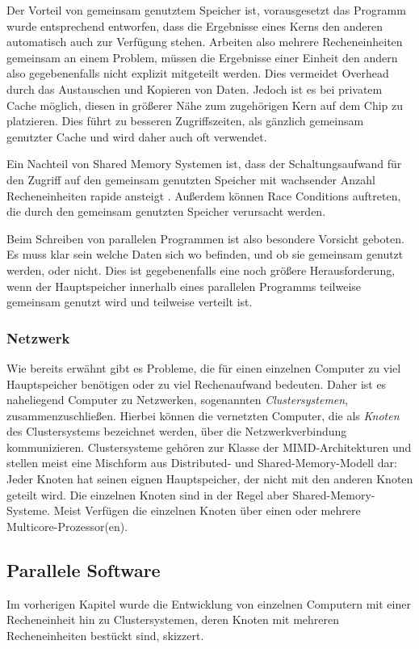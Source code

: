 	Der Vorteil von gemeinsam genutztem Speicher ist, vorausgesetzt das Programm wurde entsprechend entworfen, dass die Ergebnisse eines Kerns den anderen automatisch auch zur Verfügung stehen. 
	Arbeiten  also mehrere Recheneinheiten gemeinsam an einem Problem, müssen die Ergebnisse einer Einheit den andern also gegebenenfalls nicht explizit mitgeteilt werden. Dies vermeidet Overhead
	durch das Austauschen und Kopieren von Daten.
	Jedoch ist es bei privatem Cache möglich, diesen in größerer Nähe zum zugehörigen Kern auf dem Chip zu platzieren. Dies führt zu besseren Zugriffszeiten, als gänzlich gemeinsam genutzter 
	Cache und wird daher auch oft verwendet. 
	
	Ein Nachteil von Shared Memory Systemen ist, dass der Schaltungsaufwand für den Zugriff auf den gemeinsam genutzten Speicher mit wachsender Anzahl Recheneinheiten rapide ansteigt
	\citep{hpcskript}. Außerdem können Race Conditions auftreten, die durch den gemeinsam genutzten Speicher verursacht werden.
	
	Beim Schreiben von parallelen Programmen ist also besondere Vorsicht geboten. Es muss klar sein welche Daten sich wo befinden, und ob sie gemeinsam genutzt werden, oder nicht.
	Dies ist gegebenenfalls eine noch größere Herausforderung, wenn der Hauptspeicher innerhalb eines parallelen Programms teilweise gemeinsam genutzt wird und teilweise verteilt ist.
	
      \subsubsection{Netzwerk}
      \label{sec:netzwerk}
		
	Wie bereits erwähnt gibt es Probleme, die für einen einzelnen Computer zu viel Hauptspeicher benötigen oder zu viel Rechenaufwand bedeuten. Daher ist es naheliegend Computer zu Netzwerken,
	sogenannten \textit{Clustersystemen}, zusammenzuschließen. Hierbei können die vernetzten Computer, die als \textit{Knoten} des Clustersystems bezeichnet werden, über die 
	Netzwerkverbindung kommunizieren. Clustersysteme gehören zur Klasse der MIMD-Architekturen und stellen meist eine Mischform aus Distributed- und Shared-Memory-Modell dar: Jeder Knoten hat 
	seinen eignen Hauptspeicher, der nicht mit den anderen Knoten geteilt wird. Die einzelnen Knoten sind in der Regel aber Shared-Memory-Systeme. Meist Verfügen die einzelnen Knoten über
	einen oder mehrere Multicore-Prozessor(en). \citep{cluster}
	
    \subsection{Parallele Software}
      Im vorherigen Kapitel wurde die Entwicklung von einzelnen Computern mit einer Recheneinheit hin zu Clustersystemen, deren Knoten mit mehreren Recheneinheiten bestückt sind, skizzert.
      
